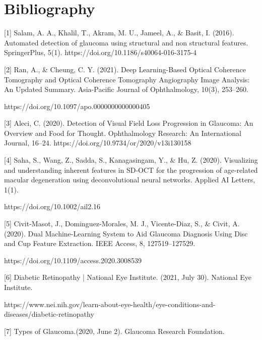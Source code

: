 \section*{Bibliography} 
[1] Salam, A. A., Khalil, T., Akram, M. U., Jameel, A., & Basit, I. (2016). Automated detection of glaucoma using structural and non structural features. SpringerPlus, 5(1). https://doi.org/10.1186/s40064-016-3175-4

\vspace{5mm}
[2] Ran, A., & Cheung, C. Y. (2021). Deep Learning-Based Optical Coherence Tomography and Optical Coherence Tomography Angiography Image Analysis: An Updated Summary. Asia-Pacific Journal of Ophthalmology, 10(3), 253–260. 

https://doi.org/10.1097/apo.0000000000000405

\vspace{5mm}
[3] Aleci, C. (2020). Detection of Visual Field Loss Progression in Glaucoma: An Overview and Food for Thought. Ophthalmology Research: An International Journal, 16–24. https://doi.org/10.9734/or/2020/v13i130158

\vspace{5mm}
[4] Saha, S., Wang, Z., Sadda, S., Kanagasingam, Y., & Hu, Z. (2020). Visualizing and understanding inherent features in SD‐OCT for the progression of age‐related macular degeneration using deconvolutional neural networks. Applied AI Letters, 1(1). 

https://doi.org/10.1002/ail2.16
 
\vspace{5mm}
[5] Civit-Masot, J., Dominguez-Morales, M. J., Vicente-Diaz, S., & Civit, A. (2020). Dual Machine-Learning System to Aid Glaucoma Diagnosis Using Disc and Cup Feature Extraction. IEEE Access, 8, 127519–127529. 

https://doi.org/10.1109/access.2020.3008539

\vspace{5mm}
[6] Diabetic Retinopathy | National Eye Institute. (2021, July 30). National Eye Institute. 

https://www.nei.nih.gov/learn-about-eye-health/eye-conditions-and-diseases/diabetic-retinopathy

\vspace{5mm}
[7] Types of Glaucoma.(2020, June 2). Glaucoma Research Foundation. 

